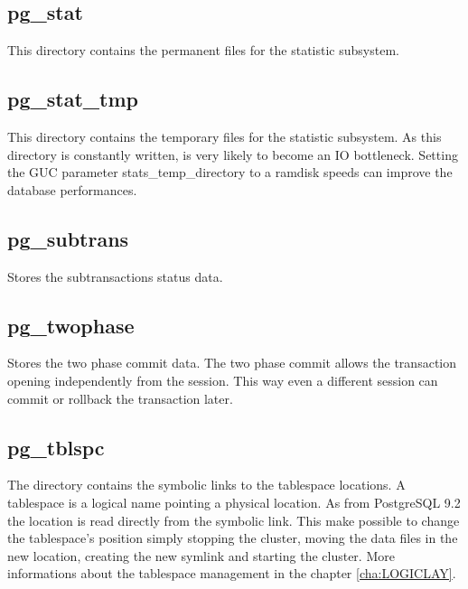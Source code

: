 \subsection{pg\_stat}
This directory contains the permanent files for the statistic subsystem. 

\subsection{pg\_stat\_tmp}
This directory contains the temporary files for the statistic subsystem. 
As this directory is constantly written, is very likely to become an 
IO bottleneck. Setting the GUC parameter stats\_temp\_directory to a ramdisk 
speeds can improve the database performances.


\subsection{pg\_subtrans}
Stores the subtransactions status data. 

\subsection{pg\_twophase}
Stores the two phase commit data. The two phase commit allows the transaction 
opening independently from the session. This way even a different session can 
commit or rollback the transaction later.

\subsection{pg\_tblspc}
\label{sub:TABLESPACE}
The directory contains the symbolic links to the tablespace locations.
A tablespace is a logical name pointing a physical location. As from PostgreSQL 
9.2 the location is read directly from the symbolic link. This make possible 
to change the tablespace's position simply stopping the cluster, moving the 
data files in the new location, creating the new symlink and starting the 
cluster.
More informations about the tablespace management in the 
chapter \ref{cha:LOGICLAY}. 



